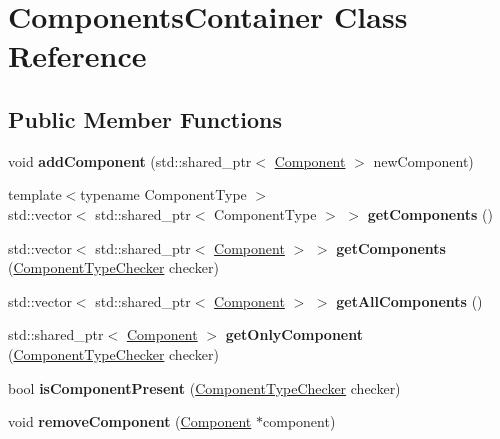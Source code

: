 \hypertarget{classComponentsContainer}{}\section{Components\+Container Class Reference}
\label{classComponentsContainer}
\subsection*{Public Member Functions}
\begin{DoxyCompactItemize}
\item 
void {\bfseries add\+Component} (std\+::shared\+\_\+ptr$<$ \hyperlink{classComponent}{Component} $>$ new\+Component)\hypertarget{classComponentsContainer_a1d0e9c6769a9ab7245a193670cb60433}{}\label{classComponentsContainer_a1d0e9c6769a9ab7245a193670cb60433}

\item 
{\footnotesize template$<$typename Component\+Type $>$ }\\std\+::vector$<$ std\+::shared\+\_\+ptr$<$ Component\+Type $>$ $>$ {\bfseries get\+Components} ()\hypertarget{classComponentsContainer_a343f4ce6a7b5660522d0443f2a731359}{}\label{classComponentsContainer_a343f4ce6a7b5660522d0443f2a731359}

\item 
std\+::vector$<$ std\+::shared\+\_\+ptr$<$ \hyperlink{classComponent}{Component} $>$ $>$ {\bfseries get\+Components} (\hyperlink{classComponentTypeChecker}{Component\+Type\+Checker} checker)\hypertarget{classComponentsContainer_a65a03d86c1acd71561ac0e97d02c69be}{}\label{classComponentsContainer_a65a03d86c1acd71561ac0e97d02c69be}

\item 
std\+::vector$<$ std\+::shared\+\_\+ptr$<$ \hyperlink{classComponent}{Component} $>$ $>$ {\bfseries get\+All\+Components} ()\hypertarget{classComponentsContainer_a037964e3642fbf43a1f48bd2a8ed66af}{}\label{classComponentsContainer_a037964e3642fbf43a1f48bd2a8ed66af}

\item 
std\+::shared\+\_\+ptr$<$ \hyperlink{classComponent}{Component} $>$ {\bfseries get\+Only\+Component} (\hyperlink{classComponentTypeChecker}{Component\+Type\+Checker} checker)\hypertarget{classComponentsContainer_a706b6e740715baf62254a1ad22d35f73}{}\label{classComponentsContainer_a706b6e740715baf62254a1ad22d35f73}

\item 
bool {\bfseries is\+Component\+Present} (\hyperlink{classComponentTypeChecker}{Component\+Type\+Checker} checker)\hypertarget{classComponentsContainer_ad0b2b7ab32d0e231c63578f537d0875c}{}\label{classComponentsContainer_ad0b2b7ab32d0e231c63578f537d0875c}

\item 
void {\bfseries remove\+Component} (\hyperlink{classComponent}{Component} $\ast$component)\hypertarget{classComponentsContainer_aad6e15f7d4758d36e7a356d31ebe1750}{}\label{classComponentsContainer_aad6e15f7d4758d36e7a356d31ebe1750}

\end{DoxyCompactItemize}


